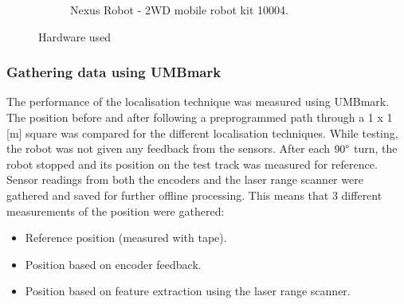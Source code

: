 \begin{figure}[ht]
\begin{subfigure}[t]{0.4\textwidth}
    \caption{Nexus Robot - 2WD mobile robot kit 10004.}
    \label{nexus_robot}
  \end{subfigure}
    \caption{Hardware used}
\end{figure}

\subsubsection{Gathering data using UMBmark}
The performance of the localisation technique was measured using UMBmark. 
The position before and after following a preprogrammed path through a 1 x 1 [m] square %
was compared for the different localisation techniques.
While testing, the robot was not given any feedback from the sensors.
After each $90 \degree$ turn, the robot stopped and its position on the test track was measured for reference.  
Sensor readings from both the encoders and the laser range scanner were gathered and saved for further offline processing. 
This means that 3 different measurements of the position were gathered: 
\begin{itemize}
	\item Reference position (measured with tape).
	\item Position based on encoder feedback. 
	\item Position based on feature extraction using the laser range scanner. 
\end{itemize}


